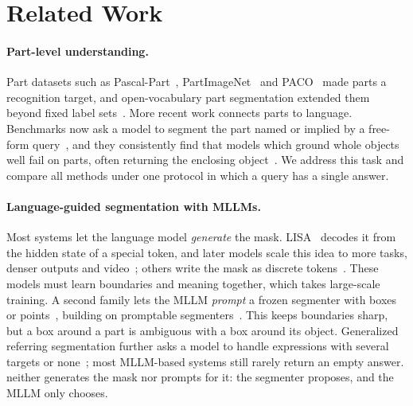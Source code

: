 \section{Related Work}
\label{sec:related}

\paragraph{Part-level understanding.}
Part datasets such as Pascal-Part~\cite{chen2014detect}, PartImageNet~\cite{he2022partimagenet} and
PACO~\cite{ramanathan2023paco} made parts a recognition target, and open-vocabulary part segmentation extended
them beyond fixed label sets~\cite{sun2023going,wei2023ov,choi2025fine}. More recent work connects parts to
language. Benchmarks now ask a model to segment the part named or implied by a free-form
query~\cite{liu2025towards,wan2025instructpart,blume2026partonomy}, and they consistently find that models which
ground whole objects well fail on parts, often returning the enclosing
object~\cite{mehrab2026reasoning,jhang2026enhancing}. We address this task and compare all methods under one
protocol in which a query has a single answer.

\paragraph{Language-guided segmentation with MLLMs.}
Most systems let the language model \emph{generate} the mask. LISA~\cite{lai2024lisa} decodes it from the hidden
state of a special token, and later models scale this idea to more tasks, denser outputs and
video~\cite{rasheed2024glamm,ren2024pixellm,zhang2024omg,yuan2025sa2va,liu2026unipixel,wei2025instructseg}; others
write the mask as discrete tokens~\cite{zhou2026samtok}. These models must learn boundaries and meaning together,
which takes large-scale training. A second family lets the MLLM \emph{prompt} a frozen segmenter with boxes or
points~\cite{chen2024sam4mllm,liu2025seg,liu2025visionreasoner,mehrab2026reasoning}, building on promptable
segmenters~\cite{kirillov2023segment,ravi2025sam,carion2026sam,ren2024grounded}. This keeps boundaries sharp, but a
box around a part is ambiguous with a box around its object. Generalized referring segmentation further asks a
model to handle expressions with several targets or none~\cite{liu2023gres,xia2024gsva,ding2026grex}; most MLLM-based
systems still rarely return an empty answer. \ours{} neither generates the mask nor prompts for it: the segmenter
proposes, and the MLLM only chooses.

